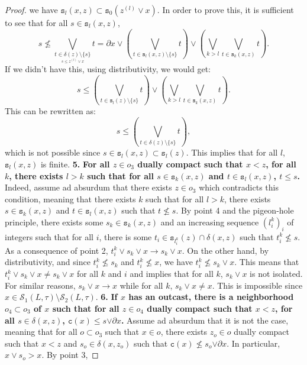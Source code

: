 \documentclass{article}
\begin{document}
\begin{proof}
{    we have $\texttt{s}_l(x,z) \subset \texttt{s}_0(z^{(l)}\vee x)$. In order to prove this, it is sufficient to see 
    that for all $s \in \texttt{s}_l(x,z)$, 
    \[s \not \le \bigvee_{\underset{s \le z^{(l)}\vee x}{t \in \delta(z) \setminus \{s\}}}t = \partial x \vee \left(\bigvee_{\underset{}{t \in \texttt{s}_l(x,z)\setminus \{s\}}}t\right) \vee \left(\bigvee_{k > l} \bigvee_{t \in \texttt{s}_k(x,z)} t\right).\]
    If we didn't have this, using distributivity, we would get:
    \[s \le \left(\bigvee_{\underset{}{t \in \texttt{s}_l(z)\setminus \{s\}}}t\right) \vee \left(\bigvee_{k > l} \bigvee_{t \in \texttt{s}_k(x,z)} t\right).\]
    This can be rewritten as: 
    \[s \le \left(\bigvee_{\underset{}{t \in \delta(z)\setminus \{s\}}}t\right),\]
    which is not possible since $s \in \texttt{s}_l(x,z) \subset \texttt{s}_l(z)$.
    }
    This implies that for all $l$, $\texttt{s}_l(x,z)$ is finite. 
    \textbf{5.} \textbf{For all $z \in o_3$ dually compact such that $x < z$, for all $k$, 
    there exists $l > k$ such that for all $s \in \texttt{s}_{k}(x,z)$ and $t \in \texttt{s}_{l}(x,z)$, $t \le s$.} Indeed, assume ad absurdum that there exists 
    $z \in o_3$ which contradicts this condition, meaning that there exists $k$ such that for all $l > k$, there exists $s \in \texttt{s}_k(x,z)$ and $t \in \texttt{s}_l(x,z)$ such that $t \not \le s$. By point 4 and the pigeon-hole principle,
    there exists some $s_k \in \texttt{s}_k(x,z)$ and an increasing sequence $(l^k_i)_i$ of integers such that for all $i$, there is some $t_i \in \texttt{s}_{l^k_i}(z) \cap \delta(x,z)$ 
    such that $t^k_i \not \le s$. As a consequence of point 2, 
    $t^k_i \vee s_k \vee x \rightarrow s_k \vee x$. On the other hand, by distributivity, and since $t^k_i \not \le s_k$ and $t^k_i \not \le x$, we have $t^k_i \not \le s_k \vee x$. This 
    means that $t^k_i \vee s_k \vee x \neq s_k \vee x$ for all $k$ and $i$ and implies that for all $k$, $s_k \vee x$ is not isolated. For similar reasons, $s_k \vee x \rightarrow x$ while for all $k$, $s_k \vee x \neq x$. This is impossible since 
    $x \in \mathcal{S}_1(L,\tau) \setminus \mathcal{S}_2(L,\tau)$.
    \textbf{6.} \textbf{If $x$ has an outcast, there is a neighborhood $o_4 \subset o_3$ of $x$ such that for all $z \in o_4$ dually compact such that $x < z$, for all $s \in \delta(x,z)$, $\texttt{c}(x) \le s { \vee \partial x}$.} Assume ad absurdum that it is not the case, meaning that for all $o \subset o_3$ such that $x \in o$, there exists $z_o \in o$ dually compact such that $x < z$ and $s_o \in \delta(x,z_o)$ such that $\texttt{c}(x) \not \le s_o { \vee \partial x}$. In particular, $x \vee s_o > x$. By point 3,

\end{proof}
\end{document}
